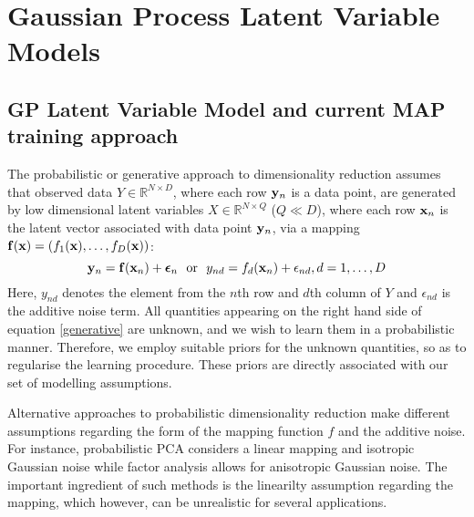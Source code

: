 
\section{Gaussian Process Latent Variable Models \label{section:background}}

\subsection{GP Latent Variable Model and current MAP training approach}

The probabilistic or generative approach to dimensionality reduction
assumes that observed data $Y \in \mathbb{R}^{N \times D}$, where each row $\mathbf{y}_n$ is a data point, are generated by 
low dimensional latent variables $X \in \mathbb{R}^{N \times Q}$ ($Q \ll D$), where 
each row $\mathbf{x}_n$ is the latent vector associated with data point $\mathbf{y}_n$, via a mapping 
$\mathbf{f}(\mathbf{x}) = (f_1 (\mathbf{x}),\ldots,f_D(\mathbf{x}))$:
\begin{equation}
\label{generative}
\mathbf{y}_n = \mathbf{f}(\mathbf{x}_n) + \boldsymbol \epsilon_n \ \  \text{or} \ \  y_{nd} = f_d(\mathbf{x}_n) + \epsilon_{nd},d=1,\ldots,D
\end{equation}
Here, $y_{nd}$ denotes the element from the $n$th row and $d$th column of $Y$ and
$\epsilon_{nd}$ is the additive noise term.
All quantities appearing on the right hand side of equation \eqref{generative}
are unknown, and we wish to learn them in a probabilistic manner. Therefore, we
employ suitable priors for the unknown quantities, so as to regularise the learning procedure.
These priors are directly associated with our set of modelling assumptions.

Alternative approaches to probabilistic dimensionality reduction 
make different assumptions regarding the form of the mapping function $f$ and the additive
noise. For instance, probabilistic PCA \citep{PPCA} considers a linear 
mapping and isotropic Gaussian noise while factor analysis allows for anisotropic Gaussian 
noise. The important ingredient of such methods is the linearilty assumption 
regarding the mapping, which however, can be unrealistic 
for several applications.

